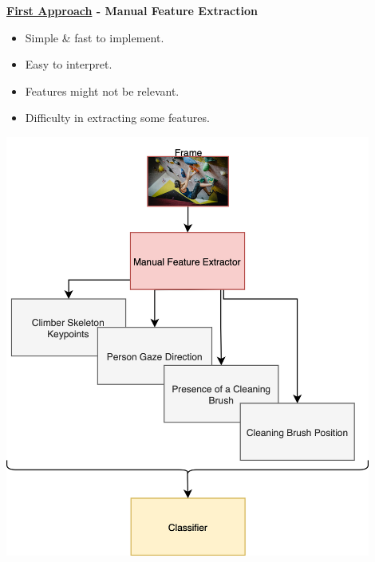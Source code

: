 \begin{frame}
    \begin{minipage}{0.45\textwidth}
        \textbf{\underline{First Approach} - Manual Feature Extraction}

        \vspace{0.5em}

        \begin{itemize}
            \item Simple \& fast to implement.
            \item Easy to interpret.
            \item Features might not be relevant.
            \item Difficulty in extracting some features. 
        \end{itemize}


    \end{minipage}%
    \hfill
    \begin{minipage}{0.45\textwidth}
        \centering
        \includegraphics[width=0.9\textwidth]{assets/visuals/first-approach-visual.drawio.png} %
        
    \end{minipage}
\end{frame}


